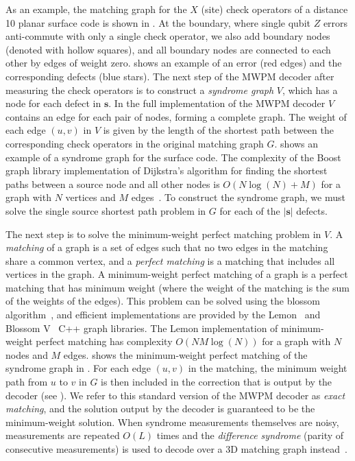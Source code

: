 \documentclass{article}
\begin{document}
As an example, the matching graph for the $X$ (site) check operators of a distance 10 planar surface code is shown in .
At the boundary, where single qubit $Z$ errors anti-commute with only a single check operator, we also add boundary nodes (denoted with hollow squares), and all boundary nodes are connected to each other by edges of weight zero.
 shows an example of an error (red edges) and the corresponding defects (blue stars).
The next step of the MWPM decoder after measuring the check operators is to construct a \textit{syndrome graph} $V$, which has a node for each defect in $\mathbf{s}$.
In the full implementation of the MWPM decoder $V$ contains an edge for each pair of nodes, forming a complete graph.
The weight of each edge $(u,v)$ in $V$ is given by the length of the shortest path between the corresponding check operators in the original matching graph $G$.
 shows an example of a syndrome graph for the surface code.
The complexity of the Boost graph library implementation of Dijkstra's algorithm for finding the shortest paths between a source node and all other nodes is $O(N\log(N)+M)$ for a graph with $N$ vertices and $M$ edges~\cite{siek2002boost}.
To construct the syndrome graph, we must solve the single source shortest path problem in $G$ for each of the $|\mathbf{s}|$ defects.

The next step is to solve the minimum-weight perfect matching problem in $V$.
A \textit{matching} of a graph is a set of edges such that no two edges in the matching share a common vertex, and a \textit{perfect matching} is a matching that includes all vertices in the graph.
A minimum-weight perfect matching of a graph is a perfect matching that has minimum weight (where the weight of the matching is the sum of the weights of the edges).
This problem can be solved using the blossom algorithm~\cite{edmonds1965paths}, and efficient implementations are provided by the Lemon~\cite{dezsHo2011lemon} and Blossom V~\cite{kolmogorov2009blossom} C++ graph libraries.
The Lemon implementation of minimum-weight perfect matching has complexity $O(NM\log(N))$ for a graph with $N$ nodes and $M$ edges.
 shows the minimum-weight perfect matching of the syndrome graph in .
For each edge $(u,v)$ in the matching, the minimum weight path from $u$ to $v$ in $G$ is then included in the correction that is output by the decoder (see ).
We refer to this standard version of the MWPM decoder as \textit{exact matching}, and the solution output by the decoder is guaranteed to be the minimum-weight solution.
When syndrome measurements themselves are noisy, measurements are repeated $O(L)$ times and the \textit{difference syndrome} (parity of consecutive measurements) is used to decode over a 3D matching graph instead~\cite{dennis2002topological}.
\end{document}

